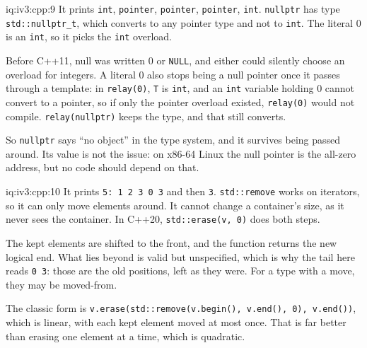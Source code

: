 \begin{solution}{iq:iv3:cpp:9}
It prints \texttt{int}, \texttt{pointer}, \texttt{pointer}, \texttt{pointer}, \texttt{int}. \texttt{nullptr} has type \texttt{std::nullptr\_t}, which converts to any pointer type and not to \texttt{int}. The literal 0 is an \texttt{int}, so it picks the \texttt{int} overload.

Before C++11, null was written 0 or \texttt{NULL}, and either could silently choose an overload for integers. A literal 0 also stops being a null pointer once it passes through a template: in \texttt{relay(0)}, \texttt{T} is \texttt{int}, and an \texttt{int} variable holding 0 cannot convert to a pointer, so if only the pointer overload existed, \texttt{relay(0)} would not compile. \texttt{relay(nullptr)} keeps the type, and that still converts.

So \texttt{nullptr} says ``no object'' in the type system, and it survives being passed around. Its value is not the issue: on x86-64 Linux the null pointer is the all-zero address, but no code should depend on that.

\end{solution}

\begin{solution}{iq:iv3:cpp:10}
It prints \texttt{5: 1 2 3 0 3} and then \texttt{3}. \texttt{std::remove} works on iterators, so it can only move elements around. It cannot change a container's size, as it never sees the container. In C++20, \texttt{std::erase(v, 0)} does both steps.

The kept elements are shifted to the front, and the function returns the new logical end. What lies beyond is valid but unspecified, which is why the tail here reads \texttt{0 3}: those are the old positions, left as they were. For a type with a move, they may be moved-from.

The classic form is \texttt{v.erase(std::remove(v.begin(), v.end(), 0), v.end())}, which is linear, with each kept element moved at most once. That is far better than erasing one element at a time, which is quadratic.

\end{solution}

